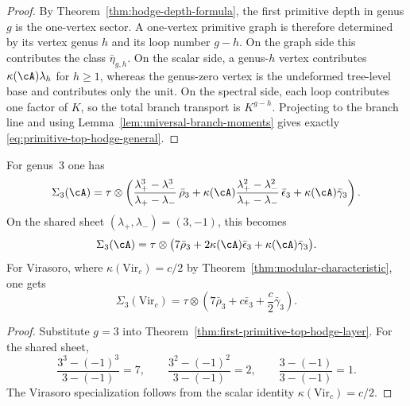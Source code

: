 \begin{proof}
By Theorem~\ref{thm:hodge-depth-formula}, the first primitive depth in
genus \(g\) is the one-vertex sector. A one-vertex primitive graph is
therefore determined by its vertex genus \(h\) and its loop number
\(g-h\). On the graph side this contributes the class
\(\bar\eta_{g,h}\). On the scalar side, a genus-\(h\) vertex contributes
\(\kappa(\cA)\lambda_h\) for \(h\geq 1\), whereas the genus-zero vertex
is the undeformed tree-level base and contributes only the unit. On the
spectral side, each loop contributes one factor of \(K\), so the total
branch transport is \(K^{g-h}\). Projecting to the branch line and
using Lemma~\ref{lem:universal-branch-moments} gives exactly
\eqref{eq:primitive-top-hodge-general}.
\end{proof}

\begin{corollary}
\label{cor:genus-three-primitive-top-hodge}
For genus~\(3\) one has
\begin{equation}
\label{eq:genus-three-primitive-top-hodge-general}
\Sigma_3(\cA)
=
\tau\otimes
\left(
\frac{\lambda_+^3-\lambda_-^3}{\lambda_+-\lambda_-}\,\bar\rho_3
+
\kappa(\cA)
\frac{\lambda_+^2-\lambda_-^2}{\lambda_+-\lambda_-}\,\bar\epsilon_3
+
\kappa(\cA)
\bar\gamma_3
\right).
\end{equation}
On the shared sheet \((\lambda_+,\lambda_-)=(3,-1)\), this becomes
\begin{equation}
\label{eq:genus-three-primitive-top-hodge-seven}
\Sigma_3(\cA)
=
\tau\otimes
\bigl(7\bar\rho_3+2\kappa(\cA)\bar\epsilon_3+\kappa(\cA)\bar\gamma_3\bigr).
\end{equation}
For Virasoro, where
\(\kappa(\mathrm{Vir}_c)=c/2\) by
Theorem~\ref{thm:modular-characteristic}, one gets
\begin{equation}
\label{eq:genus-three-primitive-virasoro}
\Sigma_3(\mathrm{Vir}_c)
=
\tau\otimes
\left(
7\bar\rho_3+c\bar\epsilon_3+\frac{c}{2}\bar\gamma_3
\right).
\end{equation}
\end{corollary}

\begin{proof}
Substitute \(g=3\) into
Theorem~\ref{thm:first-primitive-top-hodge-layer}. For the shared
sheet,
\[
\frac{3^3-(-1)^3}{3-(-1)}=7,
\qquad
\frac{3^2-(-1)^2}{3-(-1)}=2,
\qquad
\frac{3-(-1)}{3-(-1)}=1.
\]
The Virasoro specialization follows from the scalar identity
\(\kappa(\mathrm{Vir}_c)=c/2\).
\end{proof}

